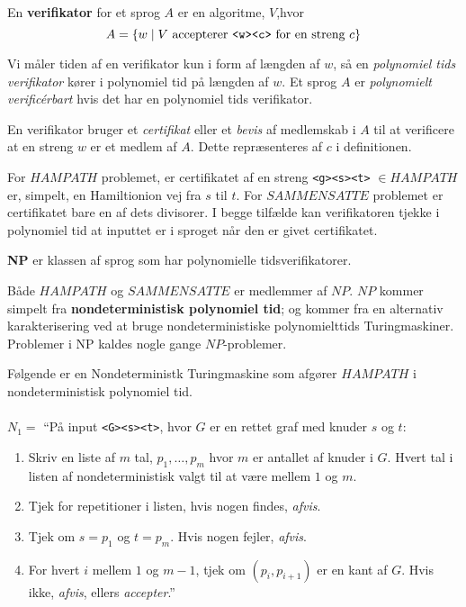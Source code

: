 \begin{definition}
	En \textbf{verifikator} for et sprog $A$ er en algoritme, $V$,hvor
	\begin{equation*}
		A = \{w \mid V \text{ accepterer \texttt{<w><c>} for en streng }c \}
	\end{equation*}

	Vi måler tiden af en verifikator kun i form af længden af $w$, så en \textit{polynomiel tids verifikator} kører i polynomiel tid på længden af $w$. Et sprog $A$ er \textit{polynomielt verificérbart} hvis det har en polynomiel tids verifikator.
\end{definition}

En verifikator bruger et \textit{certifikat} eller et \textit{bevis} af medlemskab i $A$ til at verificere at en streng $w$ er et medlem af $A$. Dette repræsenteres af $c$ i definitionen.

For $HAMPATH$ problemet, er certifikatet af en streng \texttt{<g><s><t>} $\in HAMPATH$ er, simpelt, en Hamiltionion vej fra $s$ til $t$. For $SAMMENSATTE$ problemet er certifikatet bare en af dets divisorer. I begge tilfælde kan verifikatoren tjekke i polynomiel tid at inputtet er i sproget når den er givet certifikatet.

\begin{definition}
	\textbf{NP} er klassen af sprog som har polynomielle tidsverifikatorer.
\end{definition}

Både $HAMPATH$ og $SAMMENSATTE$ er medlemmer af $NP$. $NP$ kommer simpelt fra \textbf{nondeterministisk polynomiel tid}; og kommer fra en alternativ karakterisering ved at bruge nondeterministiske polynomielttids Turingmaskiner. Problemer i NP kaldes nogle gange $NP$-problemer.

Følgende er en Nondeterministk Turingmaskine som afgører $HAMPATH$ i nondeterministisk polynomiel tid.\\\\
\noindent
$N_{1} = $ ``På input \texttt{<G><s><t>}, hvor $G$ er en rettet graf med knuder $s$ og $t$:
\begin{enumerate}
	\item Skriv en liste af $m$ tal, $p_{1}, \ldots, p_{m}$ hvor $m$ er antallet af knuder i $G$. Hvert tal i listen af nondeterministisk valgt til at være mellem $1$ og $m$.
	\item Tjek for repetitioner i listen, hvis nogen findes, \textit{afvis}.
	\item Tjek om $s = p_{1}$ og $t = p_{m}$. Hvis nogen fejler, \textit{afvis}.
	\item For hvert $i$ mellem $1$ og $m-1$, tjek om $(p_{i}, p_{i+1})$ er en kant af $G$. Hvis ikke, \textit{afvis}, ellers \textit{accepter}.''
\end{enumerate}

